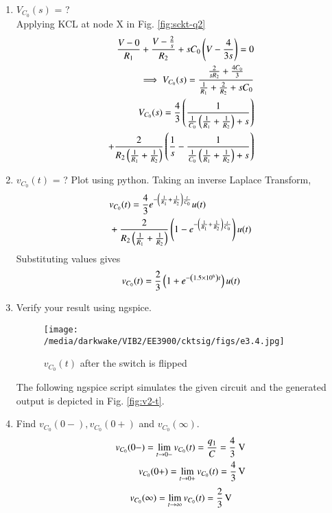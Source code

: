 \documentclass[journal,12pt,twocolumn]{IEEEtran}
\renewcommand\thesection{\arabic{section}}
\begin{document}
\begin{enumerate}[label=\arabic*.,ref=\thesection.\theenumi]
\item $V_{C_0}(s)$ = ?
\solution\\
Applying KCL at node X in Fig. \ref{fig:sckt-q2}
\begin{align}
	\frac{V - 0}{R_1} + \frac{V - \frac{2}{s}}{R_2} + sC_0\left(V - \frac{4}{3s}\right) = 0 \\
	\implies V_{C_0}(s) = \frac{\frac{2}{sR_2} + \frac{4C_0}{3}}{\frac{1}{R_1} + \frac{2}{R_2} + sC_0}\\
	\label{eq:v2-s}
	V_{C_0}(s) = \frac{4}{3}\left(\frac{1}{\frac{1}{C_0}\left(\frac{1}{R_1} + \frac{1}{R_2}\right)+s}\right) \nonumber \\
	+ \frac{2}{R_2\left(\frac{1}{R_1} +\frac{1}{R_2}\right)}\left(\frac{1}{s} - \frac{1}{\frac{1}{C_0}\left(\frac{1}{R_1} + \frac{1}{R_2}\right) + s}\right)
\end{align}
\item $v_{C_0}(t)$ = ? Plot using python.
Taking an inverse Laplace Transform,
\begin{align}
	&v_{C_0}(t) = \frac{4}{3}e^{-\left(\frac{1}{R_1} + \frac{1}{R_2}\right)\frac{t}{C_0}}u(t) \nonumber \\ 
	&+ \frac{2}{R_2\left(\frac{1}{R_1}+\frac{1}{R_2}\right)}\left(1 - e^{-\left(\frac{1}{R_1} + \frac{1}{R_2}\right)\frac{t}{C_0}}\right)u(t)
\end{align}
Substituting values gives
\begin{align}
	v_{C_0}(t) = \frac{2}{3}\left(1 +e^{-\left(1.5 \times 10^6\right)t}\right)u(t)
	\label{eq:v2-t}
\end{align}

\item Verify your result using ngspice.\\
\solution
\begin{figure}[!htb]
	\texttt{[image: /media/darkwake/VIB2/EE3900/cktsig/figs/e3.4.jpg]}
	\caption{$v_{C_0}(t)$ after the switch is flipped}
	\label{fig:v2-t}
\end{figure}
 The following ngspice script simulates the given circuit and the generated output is depicted in Fig. \eqref{fig:v2-t}.
\item Find $v_{C_0}(0-), v_{C_0}(0+)$ and  $v_{C_0}(\infty) $.\\
\solution
\begin{align}
	v_{C_0}(0-) = \lim_{t \to 0-}v_{C_0}(t) = \frac{q_1}{C} = \frac{4}{3}\text{ V}\\
	v_{C_0}(0+) = \lim_{t \to 0+}v_{C_0}(t) = \SI[parse-numbers=false]{\frac{4}{3}}{\V}
\end{align}
\begin{align}
	v_{C_0}(\infty) = \lim_{t \to \infty}v_{C_0}(t) = \SI[parse-numbers=false]{\frac{2}{3}}{\V}
\end{align}


\end{enumerate}
\end{document}
